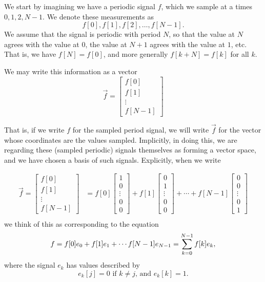 \documentclass[12pt]{report}
\theoremstyle{plain}
\begin{document}
We start by imagining we have a periodic signal $f$, which we sample at a times $0, 1, 2, N-1$. We denote these measurements as
\[ f[0], f[1], f[2], \ldots, f[N-1]. \]
We assume that the signal is periodic with period $N$, so that the value at $N$ agrees with the value at $0$, the value at $N+1$ agrees with the value at $1$, etc. That is, we have $f[N] = f[0]$, and more generally $f[k + N] = f[k]$ for all $k$.

We may write this information as a vector
\[
\vec f =
\left[
\begin{matrix}
f[0] \\
f[1] \\
\vdots \\
f[N-1]
\end{matrix}
\right]
\]

That is, if we write $f$ for the sampled period signal, we will write $\vec f$ for the vector whose coordinates are the values sampled.
Implicitly, in doing this, we are regarding these (sampled periodic) signals themselves as forming a vector space, and we have chosen a basis of such signals. Explicitly, when we write

\begin{align*}
\vec f =
\left[
\begin{matrix}
f[0] \\
f[1] \\
\vdots \\
f[N-1]
\end{matrix}
\right]
&=
f[0]
\left[
\begin{matrix}
1 \\
0 \\
\vdots \\
0 \\
0
\end{matrix}
\right]
+
f[1]
\left[
\begin{matrix}
0 \\
1 \\
\vdots \\
0 \\
0
\end{matrix}
\right]
+
\cdots
+
f[N-1]
\left[
\begin{matrix}
0 \\
0 \\
\vdots \\
0 \\
1
\end{matrix}
\right] \\
\end{align*}
we think of this as corresponding to the equation
\[f = f[0]e_0 + f[1] e_1 + \cdots f[N-1]e_{N-1}\\
= \sum_{k = 0}^{N-1} f[k] e_k,
\]
where the signal $e_k$ has values described by
\[ e_k[j] = 0 \text{ if $k \neq j$, and } e_k[k] = 1. \]
\end{document}
